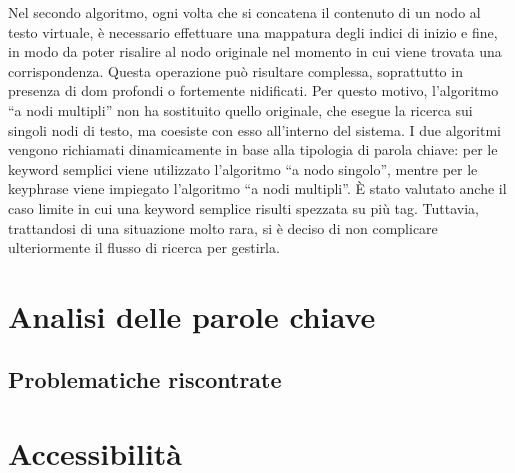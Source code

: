 \vspace{10pt}
\par\noindent Nel secondo algoritmo, ogni volta che si concatena il contenuto di un nodo al testo virtuale, è necessario effettuare una mappatura degli indici di inizio e fine, in modo da poter risalire al nodo originale nel momento in cui viene trovata una corrispondenza. Questa operazione può risultare complessa, soprattutto in presenza di \gls{dom} profondi o fortemente nidificati. Per questo motivo, l’algoritmo “a nodi multipli” non ha sostituito quello originale, che esegue la ricerca sui singoli nodi di testo, ma coesiste con esso all’interno del sistema. I due algoritmi vengono richiamati dinamicamente in base alla tipologia di parola chiave: per le keyword semplici viene utilizzato l’algoritmo “a nodo singolo”, mentre per le keyphrase viene impiegato l’algoritmo “a nodi multipli”. È stato valutato anche il caso limite in cui una keyword semplice risulti spezzata su più tag. Tuttavia, trattandosi di una situazione molto rara, si è deciso di non complicare ulteriormente il flusso di ricerca per gestirla.

\section{Analisi delle parole chiave}

\subsection{Problematiche riscontrate}

\section{Accessibilità}

